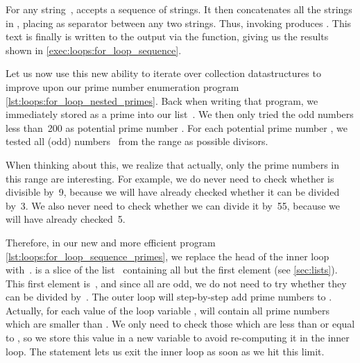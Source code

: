 For any string~,  accepts a sequence  of strings.
It then concatenates all the strings in , placing  as separator between any two strings.
Thus, invoking  produces .
This text is finally is written to the output via the  function, giving us the results shown in  \cref{exec:loops:for_loop_sequence}.


Let us now use this new ability to iterate over collection datastructures to improve upon our prime number enumeration program \cref{lst:loops:for_loop_nested_primes}.
Back when writing that program, we immediately stored  as a prime into our list~.
We then only tried the odd numbers less than~200 as potential prime number .
For each potential prime number , we tested all (odd) numbers~ from the range  as possible divisors.

When thinking about this, we realize that actually, only the prime numbers in this range are interesting.
For example, we do never need to check whether  is divisible by~9, because we will have already checked whether it can be divided by~3.
We also never need to check whether we can divide it by~55, because we will have already checked~5.

Therefore, in our new and more efficient program \cref{lst:loops:for_loop_sequence_primes}, we replace the head of the inner loop with~.
 is a slice of the list~ containing all but the first element (see \cref{sec:lists}).
This first element is~, and since all  are odd, we do not need to try whether they can be divided by~.
The outer loop will step-by-step add prime numbers to .
Actually, for each value of the loop variable ,  will contain all prime numbers which are smaller than .
We only need to check those which are less than or equal to , so we store this value in a new variable  to avoid re-computing it in the inner loop.
The  statement lets us exit the inner loop as soon as we hit this limit.

